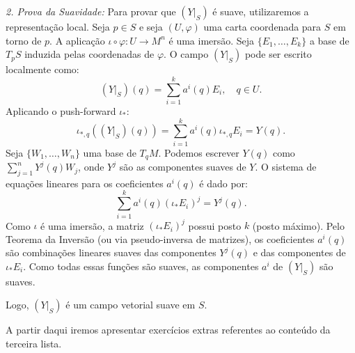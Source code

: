 {	\textit{2. Prova da Suavidade:}
	Para provar que $(Y|_S)$ é suave, utilizaremos a representação local. Seja $p \in S$ e seja $(U, \varphi)$ uma carta coordenada para $S$ em torno de $p$. A aplicação $\iota \circ \varphi : U \to M^n$ é uma imersão.
	Seja $\{E_1, \dots, E_k\}$ a base de $T_p S$ induzida pelas coordenadas de $\varphi$. O campo $(Y|_S)$ pode ser escrito localmente como:
	\begin{equation*}
		(Y|_S)(q) = \sum_{i=1}^k a^i(q) E_i, \quad q \in U.
	\end{equation*}
	Aplicando o push-forward $\iota_*$:
	\begin{equation*}
		\iota_{*,q}((Y|_S)(q)) = \sum_{i=1}^k a^i(q) \iota_{*,q} E_i = Y(q).
	\end{equation*}
	Seja $\{W_1, \dots, W_n\}$ uma base de $T_q M$. Podemos escrever $Y(q)$ como $\sum_{j=1}^n Y^j(q) W_j$, onde $Y^j$ são as componentes suaves de $Y$. O sistema de equações lineares para os coeficientes $a^i(q)$ é dado por:
	\begin{equation*}
		\sum_{i=1}^k a^i(q) (\iota_* E_i)^j = Y^j(q).
	\end{equation*}
	Como $\iota$ é uma imersão, a matriz $(\iota_* E_i)^j$ possui posto $k$ (posto máximo). Pelo Teorema da Inversão (ou via pseudo-inversa de matrizes), os coeficientes $a^i(q)$ são combinações lineares suaves das componentes $Y^j(q)$ e das componentes de $\iota_* E_i$. Como todas essas funções são suaves, as componentes $a^i$ de $(Y|_S)$ são suaves.
	
	Logo, $(Y|_S)$ é um campo vetorial suave em $S$.
}

A partir daqui iremos apresentar exercícios extras referentes ao conteúdo da terceira lista. 

